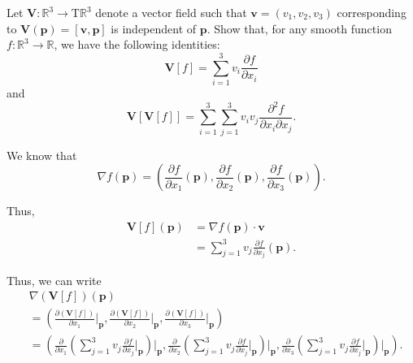 \documentclass[12 pt, letterpaper]{hmcpset}
\begin{document}
\pagebreak

\begin{problem}[Problem 4.]
	Let $\mathbf V : \mathbb R^3 \to \mathrm T \mathbb R^3$ denote a vector field such that $\mathbf v = (v_1, v_2, v_3)$ corresponding to $\mathbf V(\mathbf p) = [\mathbf v, \mathbf p]$ is independent of $\mathbf p$. Show that, for any smooth function $f : \mathbb R^3 \to \mathbb R$, we have the following identities:
	\[
		\mathbf V[f] = \sum_{i = 1}^3 v_i \frac{\partial f}{\partial x_i}
	\]
	and
	\[
		\mathbf V[\mathbf V[f]] = \sum_{i = 1}^3 \sum_{j = 1}^3 v_i v_j \frac{\partial^2 f}{\partial x_i \partial x_j}.
	\]
\end{problem}

\begin{solution}
	We know that 
	\[
		\nabla f (\mathbf p) = \left ( \frac{\partial f}{\partial x_1}(\mathbf p), \frac{\partial f}{\partial x_2}(\mathbf p), \frac{\partial f}{\partial x_3}(\mathbf p) \right ).
	\] 

	Thus,
	\[
		\begin{split}
			\mathbf V[f](\mathbf p) & = \nabla f(\mathbf p) \cdot \mathbf v \\
						& = \sum_{j = 1}^3 v_j \frac{\partial f}{\partial x_j}(\mathbf p).
		\end{split}
	\] 

	Thus, we can write
	\[
		\begin{split}
			& \nabla (\mathbf V[f])(\mathbf p) \\
			& = \left ( \frac{\partial (\mathbf V[f])}{\partial x_1} \Big |_{\mathbf p}, \frac{\partial (\mathbf V[f])}{\partial x_2} \Big |_{\mathbf p}, \frac{\partial (\mathbf V[f])}{\partial x_3} \Big |_{\mathbf p} \right ) \\
			& = \left ( \frac{\partial}{\partial x_1} \left ( \sum_{j = 1}^3 v_j \frac{\partial f}{\partial x_j} \Big |_{\mathbf p} \right ) \Big |_{\mathbf p}, \frac{\partial}{\partial x_2} \left ( \sum_{j = 1}^3 v_j \frac{\partial f}{\partial x_j} \Big |_{\mathbf p} \right ) \Big |_{\mathbf p}, \frac{\partial}{\partial x_3} \left ( \sum_{j = 1}^3 v_j \frac{\partial f}{\partial x_j} \Big |_{\mathbf p} \right ) \Big |_{\mathbf p} \right ).
		\end{split}
	\] 


\end{solution}
\end{document}
